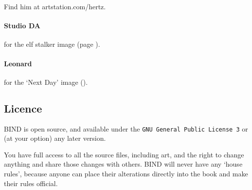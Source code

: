 \begin{multicols}{2}
Find him at artstation.com/hertz.

\paragraph{Studio DA}
for the elf stalker image
(page \pageref{Studio_DA/elf_stalker}).

\paragraph{Leonard}
for the `Next Day' image ().

\subsection*{Licence}

BIND is open source, and available under the {\tt GNU General Public License 3} or (at your option) any later version.

You have full access to all the source files, including art, and the right to change anything and share those changes with others.
BIND will never have any `house rules', because anyone can place their alterations directly into the book and make their rules official.

\end{multicols}
